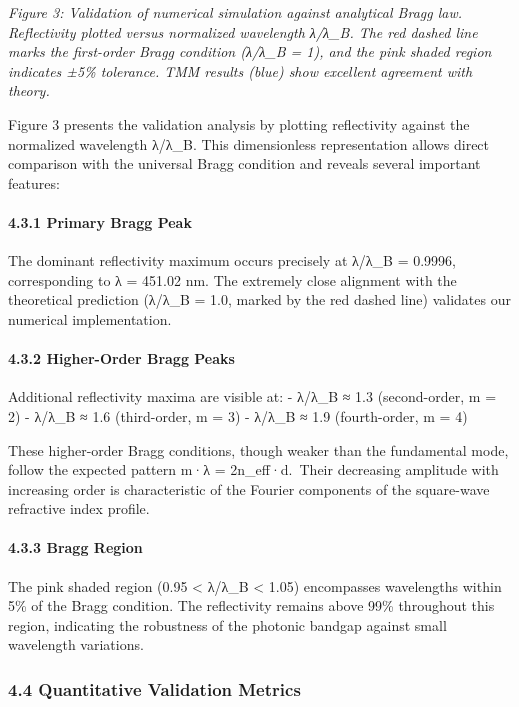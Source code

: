 \documentclass[
]{article}
\begin{document}
\emph{Figure 3: Validation of numerical simulation against analytical
Bragg law. Reflectivity plotted versus normalized wavelength λ/λ\_B. The
red dashed line marks the first-order Bragg condition (λ/λ\_B = 1), and
the pink shaded region indicates ±5\% tolerance. TMM results (blue) show
excellent agreement with theory.}

Figure 3 presents the validation analysis by plotting reflectivity
against the normalized wavelength λ/λ\_B. This dimensionless
representation allows direct comparison with the universal Bragg
condition and reveals several important features:

\paragraph{4.3.1 Primary Bragg Peak}\label{primary-bragg-peak}

The dominant reflectivity maximum occurs precisely at λ/λ\_B = 0.9996,
corresponding to λ = 451.02 nm. The extremely close alignment with the
theoretical prediction (λ/λ\_B = 1.0, marked by the red dashed line)
validates our numerical implementation.

\paragraph{4.3.2 Higher-Order Bragg
Peaks}\label{higher-order-bragg-peaks}

Additional reflectivity maxima are visible at: - λ/λ\_B ≈ 1.3
(second-order, m = 2) - λ/λ\_B ≈ 1.6 (third-order, m = 3) - λ/λ\_B ≈ 1.9
(fourth-order, m = 4)

These higher-order Bragg conditions, though weaker than the fundamental
mode, follow the expected pattern m·λ = 2n\_eff·d.~Their decreasing
amplitude with increasing order is characteristic of the Fourier
components of the square-wave refractive index profile.

\paragraph{4.3.3 Bragg Region}\label{bragg-region}

The pink shaded region (0.95 \textless{} λ/λ\_B \textless{} 1.05)
encompasses wavelengths within 5\% of the Bragg condition. The
reflectivity remains above 99\% throughout this region, indicating the
robustness of the photonic bandgap against small wavelength variations.

\subsubsection{4.4 Quantitative Validation
Metrics}\label{quantitative-validation-metrics}
\end{document}
